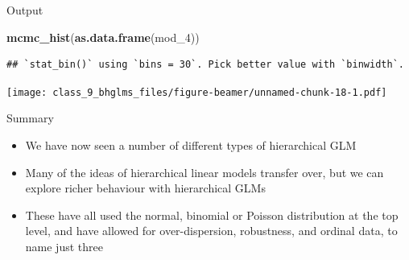 \documentclass[ignorenonframetext,]{beamer}
\newenvironment{Shaded}{\begin{snugshade}}{\end{snugshade}}
\newcommand{\KeywordTok}[1]{\textcolor[rgb]{0.13,0.29,0.53}{\textbf{#1}}}
\newcommand{\DecValTok}[1]{\textcolor[rgb]{0.00,0.00,0.81}{#1}}
\newcommand{\NormalTok}[1]{#1}
\providecommand{\tightlist}{%
  \setlength{\itemsep}{0pt}\setlength{\parskip}{0pt}}
\begin{document}
\begin{frame}[fragile]{Output}

\small

\begin{Shaded}
\begin{Highlighting}[]
\KeywordTok{mcmc_hist}\NormalTok{(}\KeywordTok{as.data.frame}\NormalTok{(mod_}\DecValTok{4}\NormalTok{))}
\end{Highlighting}
\end{Shaded}

\begin{verbatim}
## `stat_bin()` using `bins = 30`. Pick better value with `binwidth`.
\end{verbatim}

\texttt{[image: class\_9\_bhglms\_files/figure-beamer/unnamed-chunk-18-1.pdf]}

\end{frame}

\begin{frame}{Summary}

\begin{itemize}
\tightlist
\item
  We have now seen a number of different types of hierarchical GLM
\item
  Many of the ideas of hierarchical linear models transfer over, but we
  can explore richer behaviour with hierarchical GLMs
\item
  These have all used the normal, binomial or Poisson distribution at
  the top level, and have allowed for over-dispersion, robustness, and
  ordinal data, to name just three
\end{itemize}

\end{frame}
\end{document}
